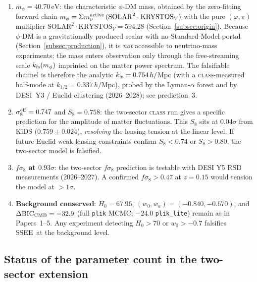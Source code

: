 \documentclass[12pt,a4paper]{article}
\newcommand{\SSEE}{\textsc{SSEE}}
\newcommand{\phiDM}{\phi\text{-DM}}
\newcommand{\kfs}{k_{\rm fs}}
\newcommand{\mphi}{m_\phi}
\newcommand{\mnu}{\Sigma m_\nu}
\newcommand{\fsig}{f\sigma_8}
\newcommand{\sigeff}{\sigma_8^{\rm eff}}
\begin{document}
\begin{tcolorbox}[falsifiable, title={Falsifiable predictions — Paper 6}]
  \begin{enumerate}
    \item \textbf{$m_\phi = 40.70\,\mathrm{eV}$}: the characteristic $\phi$-DM
      mass, obtained by the zero-fitting forward chain
      $\mphi = \mnu^{\rm active}\,(\mathrm{SOLAR}^2\cdot\mathrm{KRYSTOS}_V)$ with the
      pure $(\varphi,\pi)$ multiplier $\mathrm{SOLAR}^2\cdot\mathrm{KRYSTOS}_V = 594.28$
      (Section~\ref{subsec:origin}).  Because $\phiDM$ is a gravitationally
      produced scalar with no Standard-Model portal
      (Section~\ref{subsec:production}), it is \emph{not} accessible to
      neutrino-mass experiments; the mass enters observation only through the
      free-streaming scale $\kfs(\mphi)$ imprinted on the matter power
      spectrum.  The falsifiable channel is therefore the analytic
      $\kfs = 0.754\,h/$Mpc (with a \textsc{class}-measured half-mode at
      $k_{1/2} = 0.337\,h/$Mpc), probed by the Lyman-$\alpha$ forest and by
      DESI~Y3 / Euclid clustering (2026--2028); see prediction~3.
    \item \textbf{$\sigeff = 0.747$} and $S_8 = 0.758$: the two-sector \textsc{class}
      run gives a specific prediction for the amplitude of matter fluctuations.
      This $S_8$ sits at $0.04\sigma$ from KiDS ($0.759 \pm 0.024$), \emph{resolving}
      the lensing tension at the linear level. If future Euclid weak-lensing
      constraints confirm $S_8 < 0.74$ or $S_8 > 0.80$, the two-sector model is
      falsified.
    \item \textbf{$\fsig$ at $0.93\sigma$}: the two-sector $\fsig$ prediction is
      testable with DESI Y5 RSD measurements (2026--2027). A confirmed
      $f\sigma_8 > 0.47$ at $z = 0.15$ would tension the model at $> 1\sigma$.
    \item \textbf{Background conserved}: $H_0 = 67.96$, $(w_0, w_a) = (-0.840, -0.670)$,
      and $\Delta\mathrm{BIC}_{\rm CMB} = -32.9$ (full \texttt{plik} MCMC; $-24.0$
      \texttt{plik\_lite}) remain as in Papers~1--5.
      Any experiment detecting $H_0 > 70$ or $w_0 > -0.7$ falsifies \SSEE\ at
      the background level.
  \end{enumerate}
\end{tcolorbox}

\subsection{Status of the parameter count in the two-sector extension}
\label{subsec:zero_params}
\end{document}

